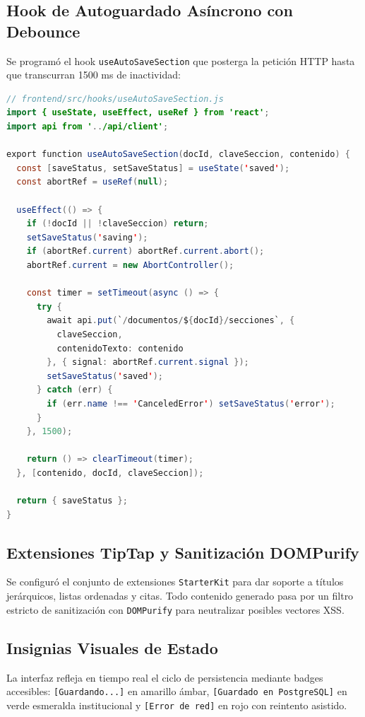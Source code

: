 \documentclass[12pt,a4paper]{article}
\begin{document}
\subsection{Hook de Autoguardado Asíncrono con Debounce}
Se programó el hook \texttt{useAutoSaveSection} que posterga la petición HTTP hasta que transcurran 1500 ms de inactividad:

\begin{lstlisting}[language=Java]
// frontend/src/hooks/useAutoSaveSection.js
import { useState, useEffect, useRef } from 'react';
import api from '../api/client';

export function useAutoSaveSection(docId, claveSeccion, contenido) {
  const [saveStatus, setSaveStatus] = useState('saved');
  const abortRef = useRef(null);

  useEffect(() => {
    if (!docId || !claveSeccion) return;
    setSaveStatus('saving');
    if (abortRef.current) abortRef.current.abort();
    abortRef.current = new AbortController();

    const timer = setTimeout(async () => {
      try {
        await api.put(`/documentos/${docId}/secciones`, {
          claveSeccion,
          contenidoTexto: contenido
        }, { signal: abortRef.current.signal });
        setSaveStatus('saved');
      } catch (err) {
        if (err.name !== 'CanceledError') setSaveStatus('error');
      }
    }, 1500);

    return () => clearTimeout(timer);
  }, [contenido, docId, claveSeccion]);

  return { saveStatus };
}
\end{lstlisting}

\subsection{Extensiones TipTap y Sanitización DOMPurify}
Se configuró el conjunto de extensiones \texttt{StarterKit} para dar soporte a títulos jerárquicos, listas ordenadas y citas. Todo contenido generado pasa por un filtro estricto de sanitización con \texttt{DOMPurify} para neutralizar posibles vectores XSS.

\subsection{Insignias Visuales de Estado}
La interfaz refleja en tiempo real el ciclo de persistencia mediante badges accesibles: \texttt{[Guardando...]} en amarillo ámbar, \texttt{[Guardado en PostgreSQL]} en verde esmeralda institucional y \texttt{[Error de red]} en rojo con reintento asistido.
\end{document}
